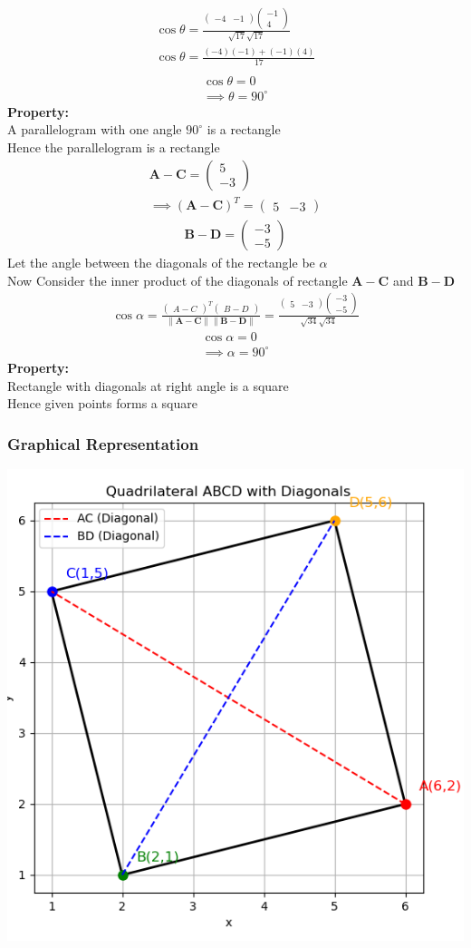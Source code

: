 \documentclass{beamer}
\theoremstyle{remark}
\newcommand{\myvec}[1]{\ensuremath{\begin{pmatrix}#1\end{pmatrix}}}
\let\vec\mathbf
\numberwithin{equation}{section}
\begin{document}
      \begin{align}
          \cos{\theta}=\frac{\myvec{-4 & -1}\myvec{-1\\4}}{\sqrt{17}\sqrt{17}}\\
          \cos{\theta}=\frac{(-4)(-1)+(-1)(4)}{17}\\
      \end{align}
      \begin{align}
          \cos{\theta}=0\\
     \implies  \theta=90^\circ
      \end{align}
      \textbf{Property:}\\
      A parallelogram with one angle $90^\circ$ is a rectangle\\
      Hence the parallelogram is a rectangle\\
      \begin{align}
      \vec{A-C}=\myvec{5\\-3}\\
      \implies \vec{(A-C)}^T=\myvec{5 & -3}
      \end{align}
      \begin{align}
          \vec{B-D}=\myvec{-3\\-5}
      \end{align}
      Let the angle between the diagonals of the rectangle be $\alpha$\\
      Now Consider the inner product of the diagonals of rectangle $\vec{A-C}$ and $\vec{B-D}$ \\
      \begin{align}
      \cos{\alpha}=\frac{\myvec{A-C}^T\myvec{B-D}}{\|\vec{A-C}\|\|\vec{B-D}\|}=\frac{\myvec{5&-3}\myvec{-3\\-5}}{\sqrt{34}\sqrt{34}}
      \end{align}
      \begin{align}
          \cos{\alpha}=0\\
       \implies \alpha=90^\circ
      \end{align}
      \textbf{Property:}\\
      Rectangle with diagonals at right angle is a square\\
      Hence given points forms a square\\
      \begin{frame}
      \frametitle{Graphical Representation}
          \centering
          \includegraphics[width=0.6\linewidth]{figs/fig1.png}
      \end{frame}
\end{document}
